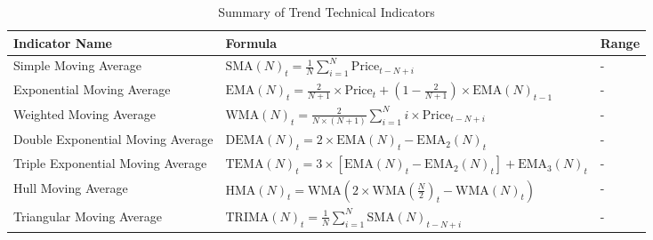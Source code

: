\begin{table}[htb!]
\caption{Summary of Trend Technical Indicators}
\label{Table:TrendIndicators}
\centering
\footnotesize
\begin{tabularx}{\textwidth}{@{}lXl@{}}
\toprule
\textbf{Indicator Name} & \textbf{Formula} & \textbf{Range} \\ 
\midrule
Simple Moving Average & $\text{SMA}(N)_t = \frac{1}{N} \sum_{i=1}^{N} \text{Price}_{t-N+i}$ & - \\
\addlinespace
Exponential Moving Average & $\text{EMA}(N)_t = \frac{2}{N+1} \times \text{Price}_t + (1 - \frac{2}{N+1}) \times \text{EMA}(N)_{t-1}$ & - \\
\addlinespace
Weighted Moving Average & $\text{WMA}(N)_t = \frac{2}{N \times (N + 1)} \sum_{i=1}^{N} i \times \text{Price}_{t-N+i}$ & - \\
\addlinespace
Double Exponential Moving Average & $\text{DEMA}(N)_t = 2 \times \text{EMA}(N)_t - \text{EMA}_2(N)_t$ & - \\
\addlinespace
Triple Exponential Moving Average & $\text{TEMA}(N)_t = 3 \times [\text{EMA}(N)_t - \text{EMA}_2(N)_t] + \text{EMA}_3(N)_t$ & - \\
\addlinespace
Hull Moving Average & $\text{HMA}(N)_t = \text{WMA}\left(2 \times \text{WMA}\left(\frac{N}{2}\right)_t - \text{WMA}(N)_t\right)$ & - \\
\addlinespace
Triangular Moving Average & $\text{TRIMA}(N)_t = \frac{1}{N} \sum_{i=1}^{N} \text{SMA}(N)_{t-N+i}$ & - \\
\bottomrule
\end{tabularx}
\end{table}

